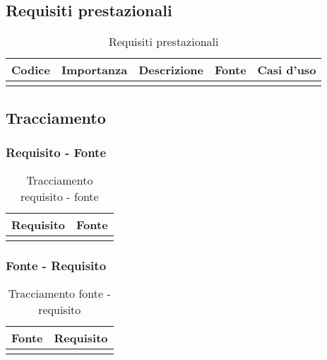 \subsection{Requisiti prestazionali}
\begin{table}[!h]
    \begin{center}
        \begin{tabular}{ |l |l |l |l| l| }
            \hline 
            \textbf{Codice} & \textbf{Importanza} & \textbf{Descrizione} & \textbf{Fonte} & \textbf{Casi d'uso}\\\hline
                            &                     &                      &                &                    \\
            
            \hline
        \end{tabular}
    \end{center}
    \caption{Requisiti prestazionali}
    \label{tab:4}
\end{table}

\subsection{Tracciamento}
\subsubsection{Requisito - Fonte}
\begin{table}[!h]
    \begin{center}
        \begin{tabular}{ |l |l | }
            \hline 
            \textbf{Requisito} & \textbf{Fonte}\\\hline
                               &               \\
            
            \hline
        \end{tabular}
    \end{center}
    \caption{Tracciamento requisito - fonte}
    \label{tab:5}
\end{table}

\subsubsection{Fonte - Requisito}
\begin{table}[!h]
    \begin{center}
        \begin{tabular}{ |l |l |}
            \hline 
            \textbf{Fonte} & \textbf{Requisito}\\\hline
                               &               \\
            
            \hline
        \end{tabular}
    \end{center}
    \caption{Tracciamento fonte - requisito}
    \label{tab:6}
\end{table}

